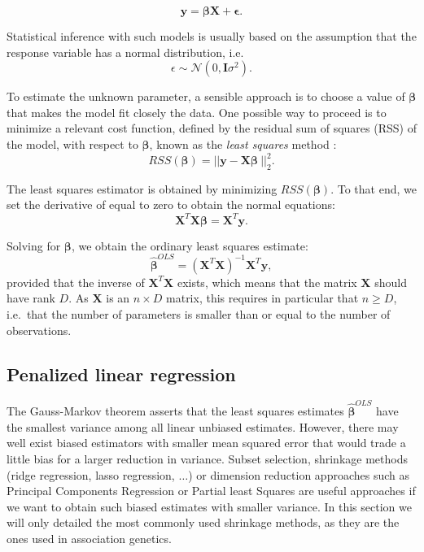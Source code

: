 \documentclass[]{book}
\begin{document}
\[\mathbf{y} = \boldsymbol{\beta}\mathrm{\mathbf{X}} + \boldsymbol{\epsilon}.\]

Statistical inference with such models is usually based on the
assumption that the response variable has a normal distribution, i.e.
\[\epsilon \sim \mathcal{N}(0, \mathbf{I}\sigma^2).\]

To estimate the unknown parameter, a sensible approach is to choose a
value of \(\boldsymbol{\beta}\) that makes the model fit closely the data. One
possible way to proceed is to minimize a relevant cost function, defined
by the residual sum of squares (RSS) of the model, with respect to
\(\boldsymbol{\beta}\), known as the \emph{least squares} method \citep{gauss1809theoria}:
\[RSS(\boldsymbol{\beta}) = || \mathbf{y} - \mathbf{X} \boldsymbol{\beta}\ ||_2^2.
\label{eq:RSS}\]

The least squares estimator is obtained by minimizing \(RSS(\boldsymbol{\beta})\). To
that end, we set the derivative of equal to zero to obtain the normal
equations: \[\mathbf{X}^T\mathbf{X}\boldsymbol{\beta} = \mathbf{X}^T\mathbf{y}.
\label{eq:normaleq}\]

Solving for \(\boldsymbol{\beta}\), we obtain the ordinary least squares estimate:
\[\hat{\boldsymbol{\beta}}^{OLS} = (\mathbf{X}^T\mathbf{X})^{-1}\mathbf{X}^T\mathbf{y},\] provided that the
inverse of \(\mathbf{X}^T\mathbf{X}\) exists, which means that the matrix \(\mathbf{X}\) should
have rank \(D\). As \(\mathbf{X}\) is an \(n \times D\) matrix, this requires in
particular that \(n \geqslant D\), i.e.~that the number of parameters is
smaller than or equal to the number of observations.

\hypertarget{penalized}{%
\subsection{Penalized linear regression}\label{penalized}}

The Gauss-Markov theorem \citep{aitkin1935least} asserts that the least
squares estimates \(\hat{\boldsymbol{\beta}}^{OLS}\) have the smallest variance among
all linear unbiased estimates. However, there may well exist biased
estimators with smaller mean squared error that would trade a little
bias for a larger reduction in variance. Subset selection, shrinkage
methods (ridge regression, lasso regression, \(\dots\)) or dimension
reduction approaches such as Principal Components Regression or Partial
least Squares are useful approaches if we want to obtain such biased
estimates with smaller variance. In this section we will only detailed
the most commonly used shrinkage methods, as they are the ones used in
association genetics.
\end{document}

